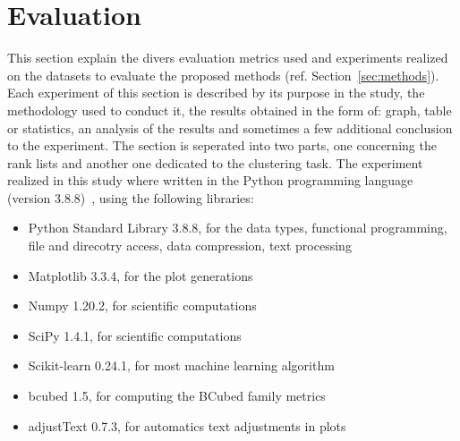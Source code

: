 \section{Evaluation \label{sec:evaluation}}

This section explain the divers evaluation metrics used and experiments realized on the datasets to evaluate the proposed methods (ref. Section~\ref{sec:methods}).
Each experiment of this section is described by its purpose in the study, the methodology used to conduct it, the results obtained in the form of: graph, table or statistics, an analysis of the results and sometimes a few additional conclusion to the experiment.
The section is seperated into two parts, one concerning the rank lists and another one dedicated to the clustering task.
The experiment realized in this study where written in the Python programming language (version 3.8.8)~\cite{python}, using the following libraries:
\begin{itemize}
  \item Python Standard Library 3.8.8, for the data types, functional programming, file and direcotry access, data compression, text processing~\cite{python_standard_library}
  \item Matplotlib 3.3.4, for the plot generations~\cite{matplotlib}
  \item Numpy 1.20.2, for scientific computations~\cite{numpy}
  \item SciPy 1.4.1, for scientific computations~\cite{scipy}
  \item Scikit-learn 0.24.1, for most machine learning algorithm~\cite{sklearn}
  \item bcubed 1.5, for computing the BCubed family metrics~\cite{bcubed_gh}
  \item adjustText 0.7.3, for automatics text adjustments in plots~\cite{adjustText}
\end{itemize}






